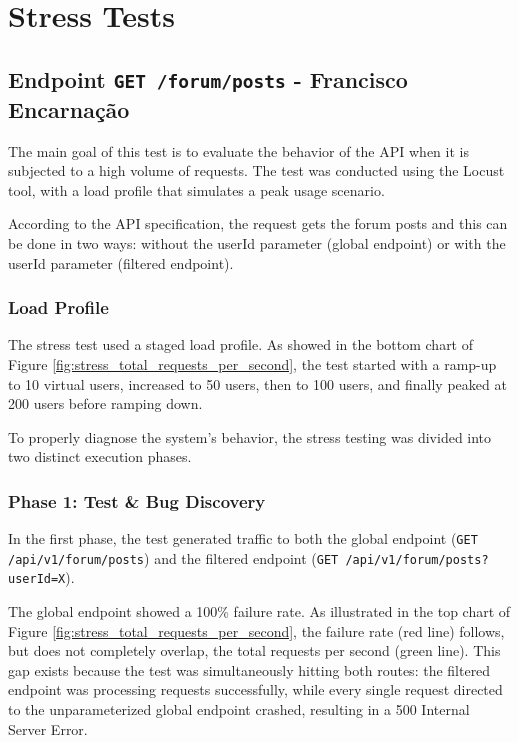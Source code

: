 \chapter{Stress Tests} \label{cap:stress}

\section{Endpoint \texttt{GET /forum/posts} - Francisco Encarnação}
The main goal of this test is to evaluate the behavior of the API when it is subjected to a high volume of requests. The test was conducted using the Locust tool, with a load profile that simulates a peak usage scenario.

According to the API specification, the request gets the forum posts and this can be done in two ways: without the userId parameter (global endpoint) or with the userId parameter (filtered endpoint). 

\subsection{Load Profile}
The stress test used a staged load profile. As showed in the bottom chart of Figure \ref{fig:stress_total_requests_per_second}, the test started with a ramp-up to 10 virtual users, increased to 50 users, then to 100 users, and finally peaked at 200 users before ramping down.

To properly diagnose the system's behavior, the stress testing was divided into two distinct execution phases.

\subsection{Phase 1: Test \& Bug Discovery}
In the first phase, the test generated traffic to both the global endpoint (\texttt{GET /api/v1/forum/posts}) and the filtered endpoint (\texttt{GET /api/v1/forum/posts?userId=X}).

The global endpoint showed a 100\% failure rate. As illustrated in the top chart of Figure \ref{fig:stress_total_requests_per_second}, the failure rate (red line) follows, but does not completely overlap, the total requests per second (green line). This gap exists because the test was simultaneously hitting both routes: the filtered endpoint was processing requests successfully, while every single request directed to the unparameterized global endpoint crashed, resulting in a 500 Internal Server Error.

